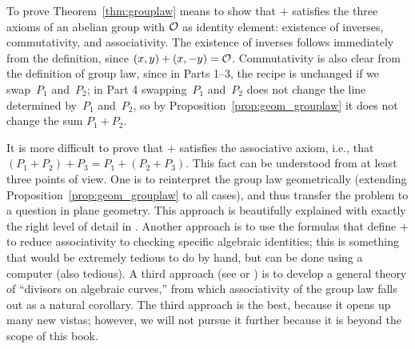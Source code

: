 To prove Theorem~\ref{thm:grouplaw} means to show that $+$ satisfies
the three axioms of an abelian group with $\mathcal{O}$ as identity element:
existence of inverses, commutativity, and associativity.  The
existence of inverses follows immediately from the definition, since
$(x,y)+(x,-y)=\mathcal{O}$.  Commutativity is also clear from the definition of
group law, since in Parts 1--3, the recipe is unchanged if we
swap~$P_1$ and~$P_2$; in Part 4 swapping~$P_1$ and~$P_2$ does not
change the line determined by~$P_1$ and~$P_2$, so by
Proposition~\ref{prop:geom_grouplaw} it does not change the sum
$P_1+P_2$.

It is more difficult to prove that $+$ satisfies the associative
axiom, i.e., that $(P_1+P_2)+P_3 = P_1 + (P_2 + P_3)$.  This fact can
be understood from at least three points of view.  One is to
reinterpret the group law geometrically (extending
Proposition~\ref{prop:geom_grouplaw} to all cases), and thus transfer
the problem to a question in plane geometry.  This approach is
beautifully explained with exactly the right level of detail in
\cite[\S I.2]{silvermantate}. Another approach is to use the formulas
that define $+$ to reduce associativity to checking specific algebraic
identities; this is something that would be extremely tedious to do by
hand, but can be done using a computer (also tedious).
A third approach (see \cite{silverman:aec} or
\cite{hartshorne}) is to develop a general theory of ``divisors on
algebraic curves,'' from which associativity of the group law falls
out as a natural corollary.  The third approach is the best, because
it opens up many new vistas; however, we will not pursue it further
because it is beyond the scope of this book.

